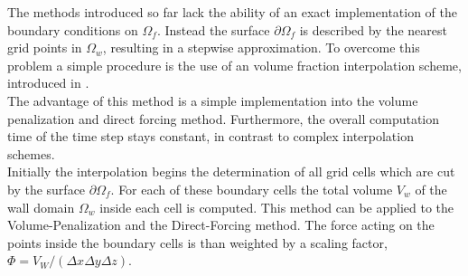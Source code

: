 The methods introduced so far lack the ability of an exact implementation of the boundary conditions on $\Omega_f$.
Instead the surface $\partial \Omega_f$ is described by the nearest grid points in $\Omega_w$, resulting in a
stepwise approximation.
To overcome this problem a simple procedure is the use of an volume fraction interpolation scheme, introduced in \citep{Fadlun2000}.\\
The advantage of this method is a simple implementation into the volume penalization and direct forcing method.
Furthermore, the overall computation time of the time step stays constant, in  contrast to complex interpolation schemes.\\
Initially the interpolation begins the determination of all grid cells which are cut by the surface $\partial \Omega_f$.
For each of these boundary cells the total volume $V_w$ of the wall domain $\Omega_w$ inside each cell is computed.
This method can be applied to the Volume-Penalization and the Direct-Forcing method.
The force acting on the points inside the boundary cells is than weighted by a scaling factor, $\Phi = V_W/(\Delta x \Delta y \Delta z)$.

